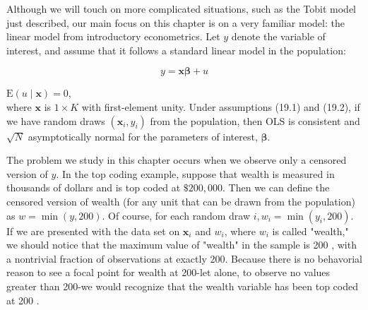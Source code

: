 \documentclass[10pt]{article}
\begin{document}
Although we will touch on more complicated situations, such as the Tobit model just described, our main focus on this chapter is on a very familiar model: the linear model from introductory econometrics. Let $y$ denote the variable of interest, and assume that it follows a standard linear model in the population:


\begin{equation*}
y=\mathbf{x} \boldsymbol{\beta}+u \tag{19.1}
\end{equation*}


$\mathrm{E}(u \mid \mathbf{x})=0$,\\
where $\mathbf{x}$ is $1 \times K$ with first-element unity. Under assumptions (19.1) and (19.2), if we have random draws $\left(\mathbf{x}_{i}, y_{i}\right)$ from the population, then OLS is consistent and $\sqrt{N}$ asymptotically normal for the parameters of interest, $\boldsymbol{\beta}$.

The problem we study in this chapter occurs when we observe only a censored version of $y$. In the top coding example, suppose that wealth is measured in\\
thousands of dollars and is top coded at $\$ 200,000$. Then we can define the censored version of wealth (for any unit that can be drawn from the population) as $w= \min (y, 200)$. Of course, for each random draw $i, w_{i}=\min \left(y_{i}, 200\right)$. If we are presented with the data set on $\mathbf{x}_{i}$ and $w_{i}$, where $w_{i}$ is called "wealth," we should notice that the maximum value of "wealth" in the sample is 200 , with a nontrivial fraction of observations at exactly 200. Because there is no behavorial reason to see a focal point for wealth at 200-let alone, to observe no values greater than 200-we would recognize that the wealth variable has been top coded at 200 .
\end{document}
